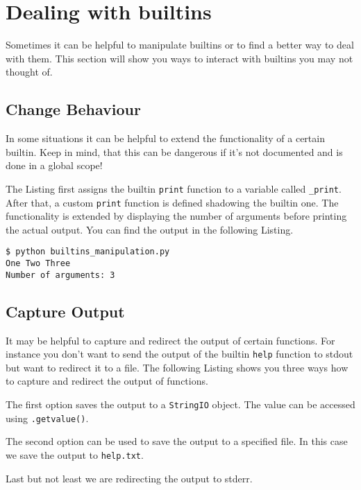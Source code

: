 
\section{Dealing with builtins}

Sometimes it can be helpful to manipulate builtins or to find a better way to deal with them.
This section will show you ways to interact with builtins you may not thought of.


\subsection{Change Behaviour}

In some situations it can be helpful to extend the functionality of a certain builtin.
Keep in mind, that this can be dangerous if it's not documented and is done in a global scope!



The Listing first assigns the builtin \lstinline{print} function to a variable called \lstinline{_print}.
After that, a custom \mbox{\lstinline{print}} function is defined shadowing the builtin one.
The functionality is extended by displaying the number of arguments before printing the actual output.
You can find the output in the following Listing.

\begin{lstlisting}[caption=Output of builtins\_manipulation.py]
$ python builtins_manipulation.py
One Two Three
Number of arguments: 3
\end{lstlisting}


\subsection{Capture Output}

It may be helpful to capture and redirect the output of certain functions.
For instance you don't want to send the output of the builtin \lstinline{help} function to stdout but want to redirect it to a file.
The following Listing shows you three ways how to capture and redirect the output of functions.



The first option saves the output to a \lstinline{StringIO} object.
The value can be accessed using \lstinline{.getvalue()}.

The second option can be used to save the output to a specified file.
In this case we save the output to \lstinline{help.txt}.

Last but not least we are redirecting the output to stderr.
